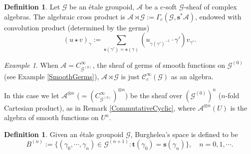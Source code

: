 \documentclass[a4paper]{amsart}
\newcommand{\maA}{\mathcal A}
\newcommand{\maC}{\mathcal C}
\newcommand{\maG}{\mathcal G}
\newcommand{\bs}{\mathbf{s}}
\newcommand{\bt}{\mathbf{t}}
\newcommand\<{\langle}
\renewcommand\>{\rangle}
\theoremstyle{definition}
\newtheorem{dfn}[theorem]{Definition}
\theoremstyle{remark}
\newtheorem{ex}[theorem]{Example}
\begin{document}
\begin{dfn}
Let $\maG$ be an \'etale groupoid, $\maA$ be a c-soft $\maG$-sheaf of complex algebras.
The algebraic cross product is $ \maA \rtimes \maG := \Gamma _c (\maG, \bs^* \maA) $,
endowed with convolution product (determined by the germs)
$$ (u \star v) _\gamma := \sum _{\bs (\gamma') = \bs (\gamma)} (u _{\gamma (\gamma')^{-1}} \cdot \gamma') v _{\gamma'} .$$
\end{dfn}

\begin{ex}
\label{CrossProd}
When $\maA = C ^\infty_{\maG ^{(0)}}$, the sheaf of germs of smooth functions on $\maG ^{(0)}$ (see Example \ref{SmoothGerms}),
$\maA \rtimes \maG $ is just $\maC^\infty_c (\maG)$ as an algebra.

In this case we let $\maA ^{\otimes n}$ ($= (C ^\infty _{\maG ^{(0)}}) ^{\otimes n}$) be the sheaf over $(\maG ^{(0)}) ^n$
($n$-fold Cartesian product), as in Remark \ref{CommutativeCyclic},
where $\maA ^{\otimes n} (U)$ is the algebra of smooth functions on $U ^n$.
\end{ex}


\begin{dfn}
Given an \'etale groupoid $\maG$, Burghelea's space is defined to be
$$ B ^{(n)} := \{ (\gamma _0, \cdots , \gamma _n) \in \maG ^{(n+1)} : \bt (\gamma _0) = \bs (\gamma _n) \}, \quad n = 0, 1, \cdots .$$
\end{dfn}
\end{document}
